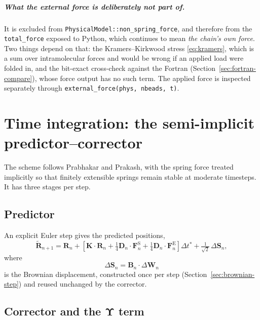 \documentclass[11pt,a4paper]{report}
\newcommand{\D}{\bm{D}}
\newcommand{\B}{\bm{B}}
\newcommand{\R}{\bm{R}}
\newcommand{\dt}{\Delta t^{*}}
\newcommand{\code}[1]{\texttt{\seqsplitcode{#1}}}
\newcommand{\seqsplitcode}[1]{#1}
\begin{document}
\paragraph{What the external force is deliberately not part of.} It is excluded
from \code{PhysicalModel::non\_spring\_force}, and therefore from the
\code{total\_force} exposed to Python, which continues to mean \emph{the chain's
own force}. Two things depend on that: the Kramers--Kirkwood stress
\eqref{eq:kramers}, which is a sum over intramolecular forces and would be wrong
if an applied load were folded in, and the bit-exact cross-check against the
Fortran (Section~\ref{sec:fortran-compare}), whose force output has no such term.
The applied force is inspected separately through \code{external\_force(phys,
nbeads, t)}.

\chapter{Time integration: the semi-implicit predictor--corrector}
\label{ch:integrator}

The scheme follows Prabhakar and Prakash, with the spring force treated
implicitly so that finitely extensible springs remain stable at moderate
timesteps. It has three stages per step.

\section{Predictor}

An explicit Euler step gives the predicted positions,
\begin{equation}
  \tilde{\R}_{n+1} = \R_n
    + \left[\bm{K}\cdot\R_n
            + \tfrac{1}{4}\D_n\cdot\bm{F}^{\mathrm{S}}_n
            + \tfrac{1}{4}\D_n\cdot\bm{F}^{\mathrm{E}}_n\right]\dt
    + \tfrac{1}{\sqrt{2}}\,\Delta\bm{S}_n ,
  \label{eq:predictor}
\end{equation}
where
\begin{equation}
  \Delta\bm{S}_n = \B_n\cdot\Delta\bm{W}_n
\end{equation}
is the Brownian displacement, constructed once per step
(Section~\ref{sec:brownian-step}) and reused unchanged by the corrector.

\section{Corrector and the \texorpdfstring{$\bm{\Upsilon}$}{Upsilon} term}
\end{document}

